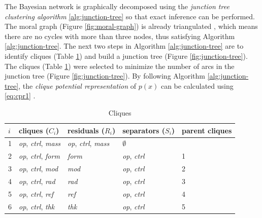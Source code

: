 The Bayesian network is graphically decomposed using the \textit{junction tree clustering algorithm} \ref{alg:junction-tree} \cite{scutari} so that exact inference can be performed.
The moral graph (Figure \ref{fig:moral-graph}) is already triangulated \cite{lauritzen1988}, which means there are no cycles with more than three nodes, thus satisfying Algorithm \ref{alg:junction-tree}.
The next two steps in Algorithm \ref{alg:junction-tree} are to identify cliques (Table \ref{table:cliques}) and build a junction tree (Figure \ref{fig:junction-tree}).
The cliques (Table \ref{table:cliques}) were selected to minimize the number of arcs in the junction tree (Figure \ref{fig:junction-tree}).
By following Algorithm \ref{alg:junction-tree}, the \textit{clique potential representation} of $p(x)$ can be calculated using \ref{eq:cpr1} \cite{lauritzen1988}.
%
\begin{table}
  \caption{Cliques}
  \label{table:cliques}
  \renewcommand\arraystretch{1.5}
  \begin{center}
    \begin{tabular}{|l l l l l|}
      \hline
      $i$ & cliques ($C_{i}$)                       & residuals ($R_{i}$)                       & separators ($S_{i}$)       & parent cliques \\
      \hline
      1 & \textit{op}, \textit{ctrl}, \textit{mass} & \textit{op}, \textit{ctrl}, \textit{mass} & $\emptyset$                & \\
      2 & \textit{op}, \textit{ctrl}, \textit{form} & \textit{form}                             & \textit{op}, \textit{ctrl} & 1 \\
      3 & \textit{op}, \textit{ctrl}, \textit{mod}  & \textit{mod}                              & \textit{op}, \textit{ctrl} & 2 \\
      4 & \textit{op}, \textit{ctrl}, \textit{rad}  & \textit{rad}                              & \textit{op}, \textit{ctrl} & 3 \\
      5 & \textit{op}, \textit{ctrl}, \textit{ref}  & \textit{ref}                              & \textit{op}, \textit{ctrl} & 4 \\
      6 & \textit{op}, \textit{ctrl}, \textit{thk}  & \textit{thk}                              & \textit{op}, \textit{ctrl} & 5 \\
      \hline
    \end{tabular}
  \end{center}
\end{table}

